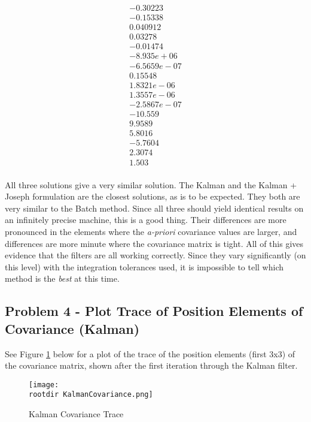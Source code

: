 \documentclass[]{article}
\newcommand{\rootdir}{./Figures/}
\begin{document}
\begin{displaymath}
{\begin{array}{c}
	     -0.30223	\\
	     -0.15338	\\
	     0.040912	\\
	      0.03278	\\	
	     -0.01474	\\
	   -8.935e+06	\\
	  -6.5659e-07	\\
	      0.15548	\\
	   1.8321e-06	\\
	   1.3557e-06	\\
	  -2.5867e-07	\\
	      -10.559	\\
  	     9.9589		\\
  	     5.8016		\\
  	    -5.7604		\\
  	     2.3074		\\
 	       1.503		\\
	\end{array}}
\end{displaymath}

All three solutions give a very similar solution. The Kalman and the Kalman + Joseph formulation are the closest solutions, as is to be expected. They both are very similar to the Batch method. Since all three should yield identical results on an infinitely precise machine, this is a good thing. Their differences are more pronounced in the elements where the \emph{a-priori} covariance values are larger, and differences are more minute where the covariance matrix is tight. All of this gives evidence that the filters are all working correctly. Since they vary significantly (on this level) with the integration tolerances used, it is impossible to tell which method is the \emph{best} at this time. 


\subsection{Problem 4 - Plot Trace of Position Elements of Covariance (Kalman)}
See Figure \ref{fig:KalmanCovariance} below for a plot of the trace of the position elements (first 3x3) of the covariance matrix, shown after the first iteration through the Kalman filter. 

\begin{figure}[H]
	\begin{center}
		\texttt{[image: \\rootdir KalmanCovariance.png]}
		\caption{Kalman Covariance Trace}
		\label{fig:KalmanCovariance}
	\end{center}
\end{figure}
\end{document}
